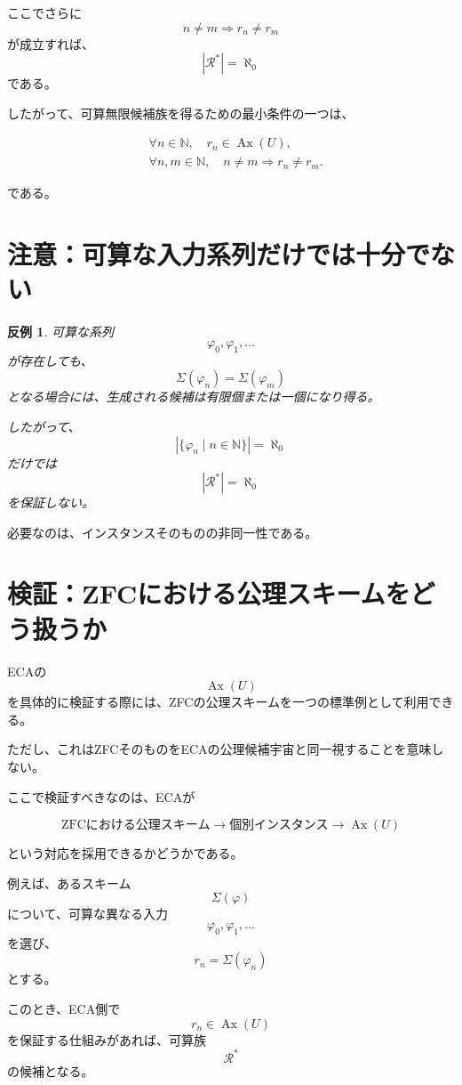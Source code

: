 \documentclass[a4paper,11pt]{article}
\newtheorem{counterexample}[definition]{反例}
\begin{document}
ここでさらに
\[
n\neq m\Longrightarrow r_n\neq r_m
\]
が成立すれば、
\[
|\mathcal{R}^*|=\aleph_0
\]
である。

したがって、可算無限候補族を得るための最小条件の一つは、

\[
\boxed{
\begin{aligned}
&\forall n\in\mathbb{N},\quad
r_n\in\operatorname{Ax}(U),\\
&\forall n,m\in\mathbb{N},\quad
n\neq m\Rightarrow r_n\neq r_m.
\end{aligned}
}
\]

である。

\section{注意：可算な入力系列だけでは十分でない}

\begin{counterexample}
可算な系列
\[
\varphi_0,\varphi_1,\ldots
\]
が存在しても、
\[
\Sigma(\varphi_n)=\Sigma(\varphi_m)
\]
となる場合には、生成される候補は有限個または一個になり得る。

したがって、
\[
|\{\varphi_n\mid n\in\mathbb{N}\}|=\aleph_0
\]
だけでは
\[
|\mathcal{R}^*|=\aleph_0
\]
を保証しない。
\end{counterexample}

必要なのは、インスタンスそのものの非同一性である。

\section{検証：ZFCにおける公理スキームをどう扱うか}

ECAの
\[
\operatorname{Ax}(U)
\]
を具体的に検証する際には、ZFCの公理スキームを一つの標準例として利用できる。

ただし、これはZFCそのものをECAの公理候補宇宙と同一視することを意味しない。

ここで検証すべきなのは、ECAが

\[
\text{ZFCにおける公理スキーム}
\longrightarrow
\text{個別インスタンス}
\longrightarrow
\operatorname{Ax}(U)
\]

という対応を採用できるかどうかである。

例えば、あるスキーム
\[
\Sigma(\varphi)
\]
について、可算な異なる入力
\[
\varphi_0,\varphi_1,\ldots
\]
を選び、
\[
r_n=\Sigma(\varphi_n)
\]
とする。

このとき、ECA側で
\[
r_n\in\operatorname{Ax}(U)
\]
を保証する仕組みがあれば、可算族
\[
\mathcal{R}^*
\]
の候補となる。
\end{document}
